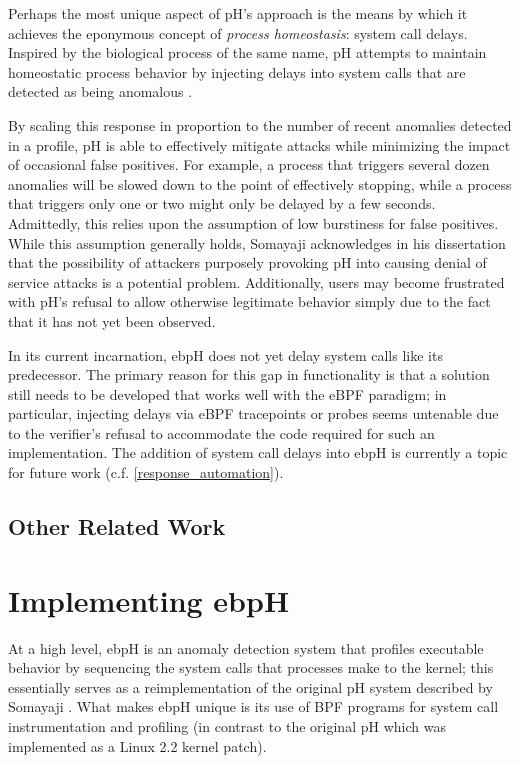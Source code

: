 \documentclass[
  12pt]{findlay}
\begin{document}
Perhaps the most unique aspect of pH's approach is the means by which it
achieves the eponymous concept of \emph{process homeostasis}: system
call delays. Inspired by the biological process of the same name, pH
attempts to maintain homeostatic process behavior by injecting delays
into system calls that are detected as being anomalous
\autocite{soma02}.

By scaling this response in proportion to the number of recent anomalies
detected in a profile, pH is able to effectively mitigate attacks while
minimizing the impact of occasional false positives. For example, a
process that triggers several dozen anomalies will be slowed down to the
point of effectively stopping, while a process that triggers only one or
two might only be delayed by a few seconds. Admittedly, this relies upon
the assumption of low burstiness for false positives. While this
assumption generally holds, Somayaji acknowledges in his dissertation
\autocite{soma02} that the possibility of attackers purposely provoking
pH into causing denial of service attacks is a potential problem.
Additionally, users may become frustrated with pH's refusal to allow
otherwise legitimate behavior simply due to the fact that it has not yet
been observed.

In its current incarnation, ebpH does not yet delay system calls like
its predecessor. The primary reason for this gap in functionality is
that a solution still needs to be developed that works well with the
eBPF paradigm; in particular, injecting delays via eBPF tracepoints or
probes seems untenable due to the verifier's refusal to accommodate the
code required for such an implementation. The addition of system call
delays into ebpH is currently a topic for future work (c.f.
\autoref{response_automation}).

\hypertarget{other-related-work}{%
\subsection{Other Related Work}\label{other-related-work}}

\hypertarget{implementing-ebph}{%
\section{Implementing ebpH}\label{implementing-ebph}}

\label{sec:impl}

At a high level, ebpH is an anomaly detection system that profiles
executable behavior by sequencing the system calls that processes make
to the kernel; this essentially serves as a reimplementation of the
original pH system described by Somayaji \autocite{soma02}. What makes
ebpH unique is its use of BPF programs for system call instrumentation
and profiling (in contrast to the original pH which was implemented as a
Linux 2.2 kernel patch).
\end{document}
